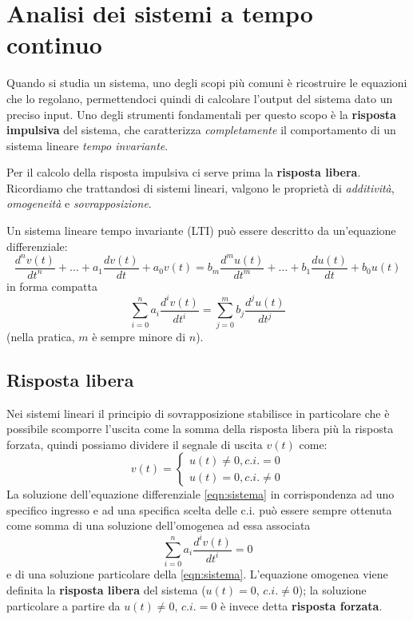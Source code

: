 \documentclass[a4paper, titlepage, oneside]{scrbook}
\begin{document}
\chapter{Analisi dei sistemi a tempo continuo}
Quando si studia un sistema, uno degli scopi più comuni è ricostruire le equazioni che lo regolano, permettendoci quindi di calcolare l'output del sistema dato un preciso input.
Uno degli strumenti fondamentali per questo scopo è la \textbf{risposta impulsiva} del sistema, che caratterizza \textit{completamente} il comportamento di un sistema lineare \textit{tempo invariante}.

Per il calcolo della risposta impulsiva ci serve prima la \textbf{risposta libera}.
Ricordiamo che trattandosi di sistemi lineari, valgono le proprietà di \textit{additività}, \textit{omogeneità} e \textit{sovrapposizione}.

Un sistema lineare tempo invariante (LTI) può essere descritto da un'equazione differenziale:
\begin{equation*}
	\frac{d^nv(t)}{dt^n} + \ldots + a_1\frac{dv(t)}{dt} + a_0v(t) = b_m\frac{d^mu(t)}{dt^m} + \ldots + b_1\frac{du(t)}{dt} + b_0u(t)
\end{equation*}
in forma compatta
\begin{equation}
	\sum_{i=0}^{n}a_i\frac{d^iv(t)}{dt^i} = \sum_{j=0}^{m}b_j\frac{d^ju(t)}{dt^j}
	\label{eqn:sistema}
\end{equation}
(nella pratica, $m$ è sempre minore di $n$).

\section{Risposta libera}
Nei sistemi lineari il principio di sovrapposizione stabilisce in particolare che è possibile scomporre l'uscita come la somma della risposta libera più la risposta forzata, quindi possiamo dividere il segnale di uscita $v(t)$ come:
\begin{equation*}
	v(t)=
		\begin{cases}
		u(t) \ne 0, c.i. = 0\\
		u(t) = 0, c.i. \ne 0
		\end{cases}
\end{equation*}
La soluzione dell'equazione differenziale \ref{eqn:sistema} in corrispondenza ad uno specifico ingresso e ad una specifica scelta delle c.i. può essere sempre ottenuta come somma di una soluzione dell'omogenea ad essa associata
\begin{equation}
	\sum_{i=0}^{n}a_i\frac{d^iv(t)}{dt^i}=0
	\label{eqn:omogenea_associata}
\end{equation}
e di una soluzione particolare della \ref{eqn:sistema}.
L'equazione omogenea viene definita la \textbf{risposta libera} del sistema ($u(t)=0$, $c.i.\ne 0$); la soluzione particolare a partire da $u(t)\ne 0$, $c.i.=0$ è invece detta \textbf{risposta forzata}.
\end{document}
